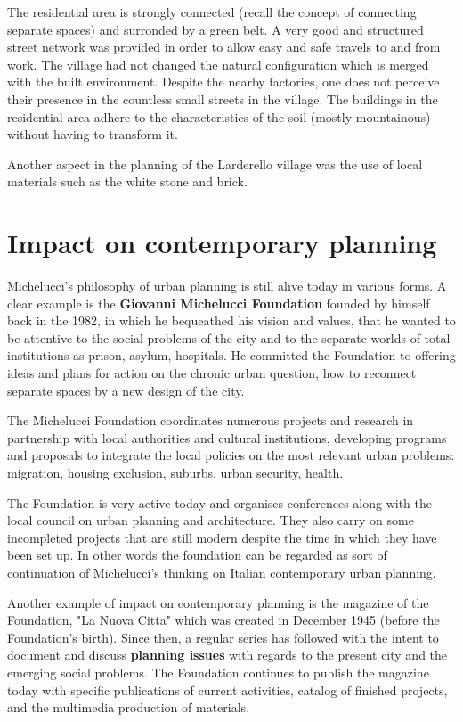\documentclass[a4paper,11pt]{article}
\begin{document}
The residential area is strongly connected (recall the concept of connecting separate spaces) and surronded by a green belt. A very good and structured street network was provided in order to allow easy and safe travels to and from work. The village had not changed the natural configuration which is merged with the built environment. Despite the nearby factories, one does not perceive their presence in the countless small streets in the village.
The buildings in the residential area adhere to the characteristics of the soil (mostly mountainous) without having to transform it. 

Another aspect in the planning of the Larderello village was the use of local materials such as the white stone and brick.

\section{Impact on contemporary planning}
Michelucci's philosophy of urban planning is still alive today in various forms.
A clear example is the \textbf{Giovanni Michelucci Foundation} founded by himself back in the 1982, in which he bequeathed his vision and values, that he wanted to be attentive to the social problems of the city and to the separate worlds of total institutions as prison, asylum, hospitals. He committed the Foundation to offering ideas and plans for action on the chronic urban question, how to reconnect separate spaces by a new design of the city.

The Michelucci Foundation coordinates numerous projects and research in partnership with local authorities and cultural institutions, developing programs and proposals to integrate the local policies on the most relevant urban problems: migration, housing exclusion, suburbs, urban security, health.

The Foundation is very active today and organises conferences along with the local council on urban planning and architecture. They also carry on some incompleted projects that are still modern despite the time in which they have been set up. In other words the foundation can be regarded as sort of continuation of Michelucci's thinking on Italian contemporary urban planning.

Another example of impact on contemporary planning is the magazine of the Foundation, "La Nuova Citta" which was created in December 1945 (before the Foundation's birth). Since then, a regular series has followed with the intent to document and discuss \textbf{planning issues} with regards to the present city and the emerging social problems. The Foundation continues to publish the magazine today with specific publications of current activities, catalog of finished projects, and the multimedia production of materials.
\end{document}
